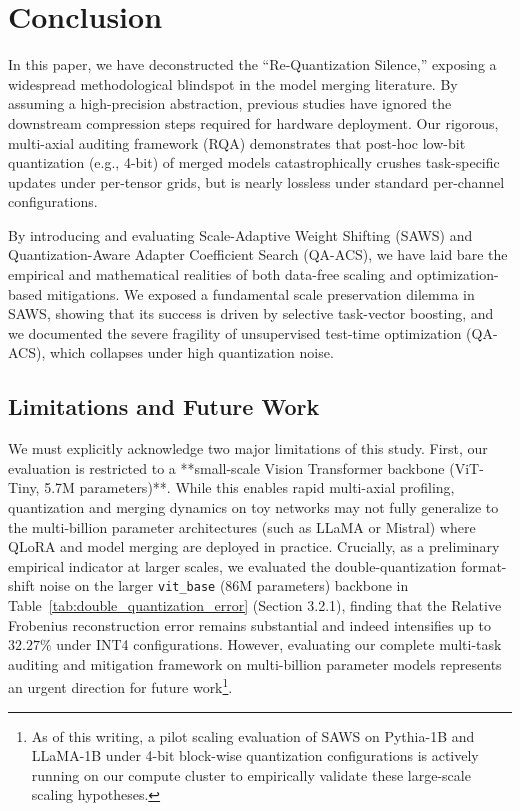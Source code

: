 \section{Conclusion}
\label{sec:conclusion}

In this paper, we have deconstructed the ``Re-Quantization Silence,'' exposing a widespread methodological blindspot in the model merging literature. By assuming a high-precision abstraction, previous studies have ignored the downstream compression steps required for hardware deployment. Our rigorous, multi-axial auditing framework (RQA) demonstrates that post-hoc low-bit quantization (e.g., 4-bit) of merged models catastrophically crushes task-specific updates under per-tensor grids, but is nearly lossless under standard per-channel configurations.

By introducing and evaluating Scale-Adaptive Weight Shifting (SAWS) and Quantization-Aware Adapter Coefficient Search (QA-ACS), we have laid bare the empirical and mathematical realities of both data-free scaling and optimization-based mitigations. We exposed a fundamental scale preservation dilemma in SAWS, showing that its success is driven by selective task-vector boosting, and we documented the severe fragility of unsupervised test-time optimization (QA-ACS), which collapses under high quantization noise.

\subsection{Limitations and Future Work}
We must explicitly acknowledge two major limitations of this study. First, our evaluation is restricted to a **small-scale Vision Transformer backbone (ViT-Tiny, 5.7M parameters)**. While this enables rapid multi-axial profiling, quantization and merging dynamics on toy networks may not fully generalize to the multi-billion parameter architectures (such as LLaMA or Mistral) where QLoRA and model merging are deployed in practice. Crucially, as a preliminary empirical indicator at larger scales, we evaluated the double-quantization format-shift noise on the larger \texttt{vit\_base} (86M parameters) backbone in Table~\ref{tab:double_quantization_error} (Section 3.2.1), finding that the Relative Frobenius reconstruction error remains substantial and indeed intensifies up to $32.27\%$ under INT4 configurations. However, evaluating our complete multi-task auditing and mitigation framework on multi-billion parameter models represents an urgent direction for future work\footnote{As of this writing, a pilot scaling evaluation of SAWS on Pythia-1B and LLaMA-1B under 4-bit block-wise quantization configurations is actively running on our compute cluster to empirically validate these large-scale scaling hypotheses.}.

